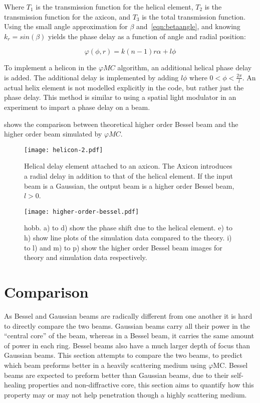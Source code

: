 Where $T_1$ is the transmission function for the helical element, $T_2$ is the transmission function for the axicon, and $T_3$ is the total transmission function.
Using the small angle approximation  for $\beta$ and~\cref{eqn:betaangle}, and knowing $k_r=sin\left(\beta\right)$ yields the phase delay as a function of angle and radial position:

\begin{equation}
\varphi(\phi,r)=k(n-1)r\alpha+l\phi
\end{equation}

To implement a helicon in the $\varphi MC$ algorithm, an additional helical phase delay is added.
The additional delay is implemented by adding $l\phi$ where $0<\phi<\tfrac{2\pi}{l}$.
An actual helix element is not modelled explicitly in the code, but rather just the phase delay.
This method is similar to using a spatial light modulator in an experiment to impart a phase delay on a beam.

 shows the comparison between theoretical higher order Bessel beam and the higher order beam simulated by $\varphi MC$.

\begin{figure}[!ht]
    \centering
    \texttt{[image: helicon-2.pdf]}
    \caption{Helical delay element attached to an axicon. The Axicon introduces a radial delay in addition to that of the helical element. If the input beam is a Gaussian, the output beam is a higher order Bessel beam, $l>0$.}
    \label{fig:helix-2}
    \vspace{-10pt}
\end{figure}

\begin{figure}[!ht]
    \centering
    \texttt{[image: higher-order-bessel.pdf]}
    \caption{\Gls*{hobb}. a) to d) show the phase shift due to the helical element. e) to h) show line plots of the simulation data compared to the theory. i) to l) and m) to p) show the higher order Bessel beam images for theory and simulation data respectively.}
    \label{fig:highordershow}
\end{figure}

\FloatBarrier
\section{Comparison}
\label{sec:compBeams}
As Bessel and Gaussian beams are radically different from one another it is hard to directly compare the two beams.
Gaussian beams carry all their power in the ``central core'' of the beam, whereas in a Bessel beam, it carries the same amount of power in each ring.
Bessel beams also have a much larger depth of focus than Gaussian beams.
This section attempts to compare the two beams, to predict which beam preforms better in a heavily scattering medium using $\varphi$MC\@.
Bessel beams are expected to preform better than Gaussian beams, due to their self-healing properties and non-diffractive core, this section aims to quantify how this property may or may not help penetration though a highly scattering medium. 


